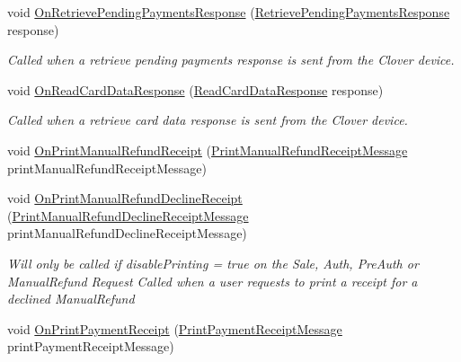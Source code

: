 \begin{DoxyCompactItemize}
void \hyperlink{interfacecom_1_1clover_1_1remotepay_1_1sdk_1_1_i_clover_connector_listener_a3567d50af6c179c41d0a47eaf4e5127b}{On\+Retrieve\+Pending\+Payments\+Response} (\hyperlink{classcom_1_1clover_1_1remotepay_1_1sdk_1_1_retrieve_pending_payments_response}{Retrieve\+Pending\+Payments\+Response} response)
\begin{DoxyCompactList}\small\item\em Called when a retrieve pending payments response is sent from the Clover device. \end{DoxyCompactList}\item 
void \hyperlink{interfacecom_1_1clover_1_1remotepay_1_1sdk_1_1_i_clover_connector_listener_af4bbb0ceeab318ef482f0e90506d36b0}{On\+Read\+Card\+Data\+Response} (\hyperlink{classcom_1_1clover_1_1remotepay_1_1sdk_1_1_read_card_data_response}{Read\+Card\+Data\+Response} response)
\begin{DoxyCompactList}\small\item\em Called when a retrieve card data response is sent from the Clover device. \end{DoxyCompactList}\item 
void \hyperlink{interfacecom_1_1clover_1_1remotepay_1_1sdk_1_1_i_clover_connector_listener_aad5540cbd5e7a4a80ae2cc562013cc98}{On\+Print\+Manual\+Refund\+Receipt} (\hyperlink{classcom_1_1clover_1_1remotepay_1_1sdk_1_1_print_manual_refund_receipt_message}{Print\+Manual\+Refund\+Receipt\+Message} print\+Manual\+Refund\+Receipt\+Message)
\item 
void \hyperlink{interfacecom_1_1clover_1_1remotepay_1_1sdk_1_1_i_clover_connector_listener_afb0b243842251d0fa8917d21b7b71246}{On\+Print\+Manual\+Refund\+Decline\+Receipt} (\hyperlink{classcom_1_1clover_1_1remotepay_1_1sdk_1_1_print_manual_refund_decline_receipt_message}{Print\+Manual\+Refund\+Decline\+Receipt\+Message} print\+Manual\+Refund\+Decline\+Receipt\+Message)
\begin{DoxyCompactList}\small\item\em Will only be called if disable\+Printing = true on the Sale, Auth, Pre\+Auth or Manual\+Refund Request Called when a user requests to print a receipt for a declined Manual\+Refund \end{DoxyCompactList}\item 
void \hyperlink{interfacecom_1_1clover_1_1remotepay_1_1sdk_1_1_i_clover_connector_listener_ab37a0d5e7114499b3f1c55e38f6c46c9}{On\+Print\+Payment\+Receipt} (\hyperlink{classcom_1_1clover_1_1remotepay_1_1sdk_1_1_print_payment_receipt_message}{Print\+Payment\+Receipt\+Message} print\+Payment\+Receipt\+Message)

\end{DoxyCompactItemize}
